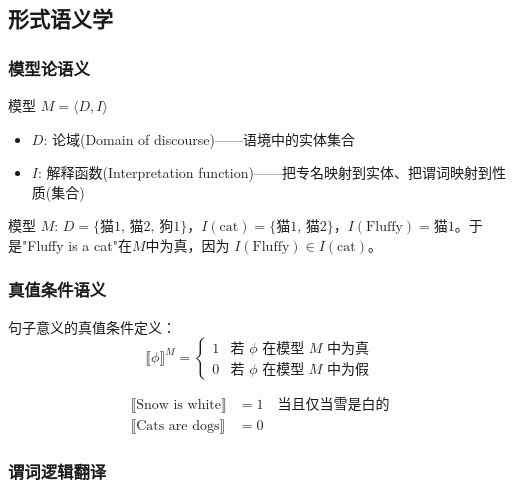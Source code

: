 \subsection{形式语义学}

\subsubsection{模型论语义}

\begin{definition}[模型]
模型 $M = \langle D, I \rangle$
\begin{itemize}
    \item $D$: 论域(Domain of discourse)——语境中的实体集合
    \item $I$: 解释函数(Interpretation function)——把专名映射到实体、把谓词映射到性质(集合)
\end{itemize}
\end{definition}

\begin{example}
模型 $M$: $D = \{ \text{猫1, 猫2, 狗1} \}$，$I(\text{cat}) = \{ \text{猫1, 猫2} \}$，$I(\text{Fluffy}) = \text{猫1}$。于是"Fluffy is a cat"在$M$中为真，因为 $I(\text{Fluffy}) \in I(\text{cat})$。
\end{example}

\subsubsection{真值条件语义}

句子意义的真值条件定义：
\begin{equation}
    \llbracket \phi \rrbracket^M = 
    \begin{cases}
        1 & \text{若 } \phi \text{ 在模型 } M \text{ 中为真} \\
        0 & \text{若 } \phi \text{ 在模型 } M \text{ 中为假}
    \end{cases}
\end{equation}

\begin{example}
\begin{align*}
    \llbracket \text{Snow is white} \rrbracket &= 1 \quad \text{当且仅当雪是白的} \\
    \llbracket \text{Cats are dogs} \rrbracket &= 0
\end{align*}
\end{example}

\subsubsection{谓词逻辑翻译}

